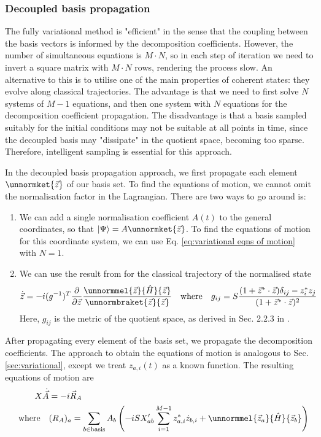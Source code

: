 \documentclass[12pt]{article}
\begin{document}
	\subsubsection{Decoupled basis propagation}\label{sec:decoupled equations of motion}
	The fully variational method is "efficient" in the sense that the coupling between the basis vectors is informed by the decomposition coefficients. However, the number of simultaneous equations is $M\cdot N$, so in each step of iteration we need to invert a square matrix with $M\cdot N$ rows, rendering the process slow. An alternative to this is to utilise one of the main properties of coherent states: they evolve along classical trajectories. The advantage is that we need to first solve $N$ systems of $M-1$ equations, and then one system with $N$ equations for the decomposition coefficient propagation. The disadvantage is that a basis sampled suitably for the initial conditions may not be suitable at all points in time, since the decoupled basis may "dissipate" in the quotient space, becoming too sparse. Therefore, intelligent sampling is essential for this approach.
	
	In the decoupled basis propagation approach, we first propagate each element $\unnormket{\vec{z}}$ of our basis set. To find the equations of motion, we cannot omit the normalisation factor in the Lagrangian. There are two ways to go around is:
	\begin{enumerate}
		\item We can add a single normalisation coefficient $A(t)$ to the general coordinates, so that $\ket{\Psi}=A\unnormket{\vec{z}}$. To find the equations of motion for this coordinate system, we can use Eq. \ref{eq:variational eqns of motion} with $N=1$.
		\item We can use the result from \cite{Aguiar} for the classical trajectory of the normalised state
		\begin{equation}
		\dot{\vec{z}}=-i(g^{-1})^T\pdv{\vec{z}}\frac{\unnormmel{\vec{z}}{\hat{H}}{\vec{z}}}{\unnormbraket{\vec{z}}{\vec{z}}}\qq{where}g_{ij}=S\frac{(1+\vec{z}^*\cdot \vec{z})\delta_{ij}-z^*_iz_j}{(1+\vec{z}^*\cdot \vec{z})^2}
		\end{equation}
		Here, $g_{ij}$ is the metric of the quotient space, as derived in Sec. 2.2.3 in \cite{Aguiar}.
	\end{enumerate}
	
	After propagating every element of the basis set, we propagate the decomposition coefficients. The approach to obtain the equations of motion is analogous to Sec. \ref{sec:variational}, except we treat $z_{a,i}(t)$ as a known function. The resulting equations of motion are
	\begin{equation}
	\begin{split}
	X\dot{\vec{A}}&=-i\vec{R}_A\\
	\qq{where}&(R_A)_a=\sum_{b\in\text{basis}}A_b\left(-iSX_{ab}'\sum_{i=1}^{M-1}z_{a,i}^*\dot{z}_{b,i}+\unnormmel{\vec{z}_a}{\hat{H}}{\vec{z}_b}\right)
	\end{split}
	\end{equation}
	
\end{document}
